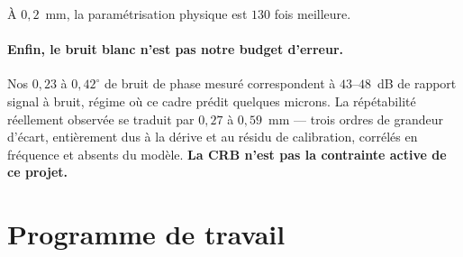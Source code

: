 \documentclass[11pt,a4paper]{article}
\begin{document}
À $0{,}2$~mm, la paramétrisation physique est $130$ fois meilleure.

\paragraph{Enfin, le bruit blanc n'est pas notre budget d'erreur.} Nos
$0{,}23$ à $0{,}42^\circ$ de bruit de phase mesuré correspondent à $43$--$48$~dB
de rapport signal à bruit, régime où ce cadre prédit quelques microns. La
répétabilité réellement observée se traduit par $0{,}27$ à $0{,}59$~mm --- trois
ordres de grandeur d'écart, entièrement dus à la dérive et au résidu de
calibration, corrélés en fréquence et absents du modèle. \textbf{La CRB n'est pas
la contrainte active de ce projet.}

\section{Programme de travail}
\label{sec:programme}
\end{document}
